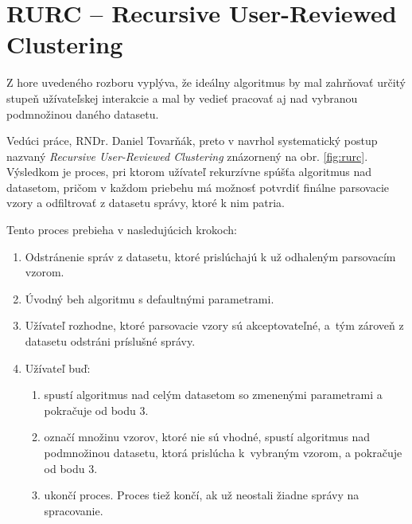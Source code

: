 \section{RURC -- Recursive User-Reviewed Clustering}
\label{sec:rurc}
Z hore uvedeného rozboru vyplýva, že ideálny algoritmus by mal zahrňovať určitý stupeň užívateľskej interakcie a mal by vedieť pracovať aj nad vybranou podmnožinou daného datasetu. 
\par Vedúci práce, RNDr. Daniel Tovarňák, preto v \parencite{Tovarnak2017} navrhol syste\-matický postup nazvaný \emph{Recursive User-Reviewed Clustering} znázornený na obr. \ref{fig:rurc}. Výsledkom je proces, pri ktorom užívateľ rekurzívne spúšťa algoritmus nad datasetom, pričom v každom priebehu má možnosť potvrdiť finálne parsovacie vzory a odfiltrovať z datasetu správy, ktoré k nim patria. 
\par Tento proces prebieha v nasledujúcich krokoch:

\begin{enumerate}
  \item Odstránenie správ z datasetu, ktoré prislúchajú k už odhaleným parsovacím vzorom.
  \item Úvodný beh algoritmu s defaultnými parametrami.
  \item Užívateľ rozhodne, ktoré parsovacie vzory sú akceptovateľné, a~tým zároveň z datasetu odstráni príslušné správy.
  \item Užívateľ buď:
  	\begin{enumerate}
   		 \item spustí algoritmus nad celým datasetom so zmenenými parametrami a pokračuje od bodu 3.
   		 \item označí množinu vzorov, ktoré nie sú vhodné, spustí algoritmus nad podmnožinou datasetu, ktorá prislúcha k~vyb\-raným vzorom, a 				pokračuje od bodu 3.
   		 \item ukončí proces. Proces tiež končí, ak už neostali žiadne správy na spracovanie.
 	 \end{enumerate}
\end{enumerate}

